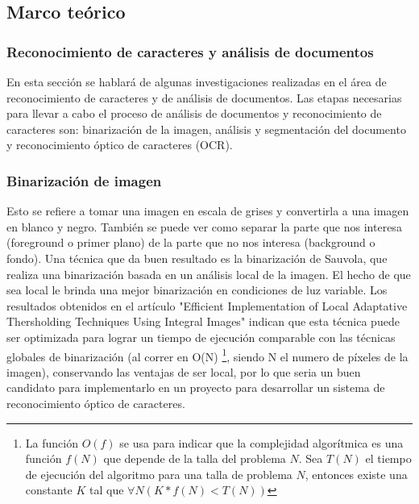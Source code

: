 \documentclass[a4paper, 11pt, oneside]{article}
\begin{document}
	\subsection {Marco teórico}
	\subsubsection{Reconocimiento de caracteres y análisis de documentos}
	En esta sección se hablará de algunas investigaciones realizadas en el área
	de reconocimiento de caracteres y de análisis de documentos.
	Las etapas necesarias para llevar a cabo el proceso de análisis de documentos
	y reconocimiento de caracteres son: binarización de la imagen, análisis y
	segmentación del documento y reconocimiento óptico de caracteres (OCR).
	
	\subsubsection{Binarización de imagen}
	Esto se refiere a tomar una imagen en escala de grises y convertirla a una 
	imagen en blanco y negro. También se puede ver como separar la parte que nos interesa
	(foreground o primer plano) de la parte que no nos interesa (background o fondo).
	Una técnica que da buen resultado es la binarización de Sauvola,
	que realiza una binarización basada en un análisis local de la imagen. El hecho de
	que sea local le brinda una mejor binarización en condiciones de luz variable. Los 
    resultados obtenidos en el artículo "Efficient Implementation of Local Adaptative 
    Thersholding Techniques Using Integral Images" indican que esta técnica puede ser
    optimizada para lograr un tiempo de ejecución comparable con las técnicas globales de 
    binarización (al correr en O(N) \footnote{La función $O(f)$ se usa para indicar que la complejidad
    algorítmica es una función $f(N)$ que depende de la talla del problema $N$. Sea $T(N)$ el tiempo de 
    ejecución del algoritmo para una talla de problema $N$, entonces existe una constante $K$ tal que 
    $\forall N ( K*f(N) < T(N) ) $}, siendo N el numero de píxeles de la imagen),
    conservando	las ventajas de ser local, por lo que seria un buen candidato para implementarlo en un 
    proyecto para desarrollar un sistema de reconocimiento óptico de caracteres.
	
\end{document}
